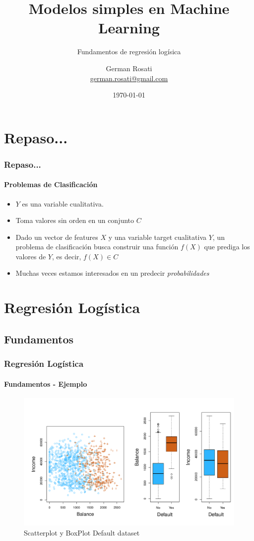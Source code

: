 \documentclass{beamer}
\title[Machine Learning en Cs. Sociales]{Modelos simples en Machine Learning}
\subtitle{Fundamentos de regresión logísica }
\author{German Rosati \\  \href{ german.rosati@gmail.com}{german.rosati@gmail.com}}
\institute{UNTREF - UNSAM - CONICET}
\date{\today}
\begin{document}
\frame{\titlepage}

\section{Repaso...}
\begin{frame}
\frametitle{Repaso... }
\framesubtitle{Problemas de Clasificación}
	\begin{itemize}
		\item $Y$ es una variable cualitativa. 
		\item Toma valores sin orden en un conjunto $C$
		\item Dado un vector de features $X$ y una variable target cualitativa $Y$, un problema de clasificación busca construir una función $f(X)$ que prediga los valores de $Y$, es decir, $f(X) \in C$
		\item Muchas veces estamos interesados en un predecir \textit{probabilidades}
	\end{itemize}
\end{frame}


\section{Regresión Logística}
\subsection{Fundamentos}
\begin{frame}
	\frametitle{Regresión Logística}
	\framesubtitle{Fundamentos - Ejemplo}
		\begin{figure}[H]	
		\centering
			\includegraphics[width=1\linewidth, height=0.7\textheight]{./img/01}
			\caption{Scatterplot y BoxPlot Default dataset \cite{hastie02}}
		\end{figure}
\end{frame}
\end{document}
